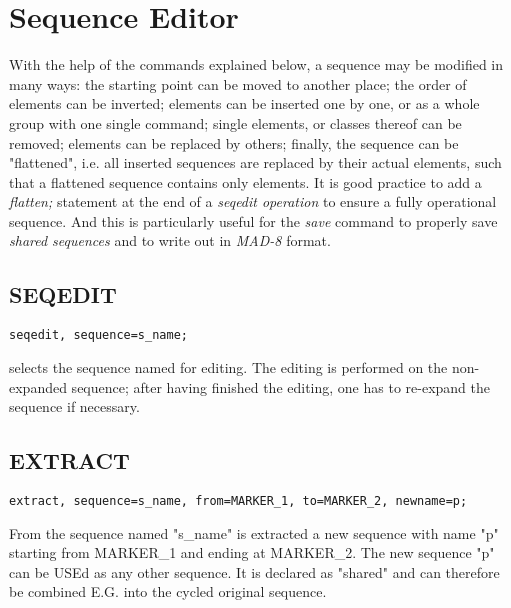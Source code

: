 
\chapter{Sequence Editor}
\label{chap:seqedit}

With the help of the commands explained below, a sequence may be
modified in many ways: the starting point can be moved to another place;
the order of elements can be inverted; elements can be inserted one by
one, or as a whole group with one single command; single elements, or
classes thereof can be removed; elements can be replaced by others;
finally, the sequence can be "flattened", i.e. all inserted sequences
are replaced by their actual elements, such that a flattened sequence
contains only elements. It is good practice to add a \textit{ flatten; }
statement at the end of a \textit{ seqedit operation } to ensure a fully
operational sequence. And this is particularly useful for the \textit{
  save } command to properly save \textit{ shared sequences } and to
write out in \textit{ MAD-8 } format.  


\section{SEQEDIT}
\begin{verbatim}
seqedit, sequence=s_name;
\end{verbatim} 
selects the sequence named for editing. The editing is performed on the
non-expanded sequence; after having finished the editing, one has to
re-expand the sequence if necessary.  

\section{EXTRACT}
\begin{verbatim}
extract, sequence=s_name, from=MARKER_1, to=MARKER_2, newname=p;
\end{verbatim} 
From the sequence named "s\_name" is extracted a new sequence with name
"p" starting from MARKER\_1 and ending at MARKER\_2. The new sequence
"p" can be USEd as any other sequence. It is declared as "shared" and
can therefore be combined E.G. into the cycled original sequence.  

